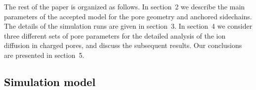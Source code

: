 \documentclass[3p,english,preprint]{elsarticle}
\newcommand{\mod}[1]{\textcolor{black}{#1}}
\begin{document}
 
The rest of the paper is organized as follows. 
In section~2 %
we describe the main parameters of
the accepted model for the  pore geometry and anchored sidechains.
The details of the  simulation runs are given in  section~3. %
In section~4 %
we consider three different sets of pore parameters for the detailed analysis of
the ion diffusion in charged pores, and discuss the subsequent results. Our conclusions are 
presented in section~5. %



























{\mod{ 
\section{Simulation model }
}}
\label{section-model}
\end{document}
